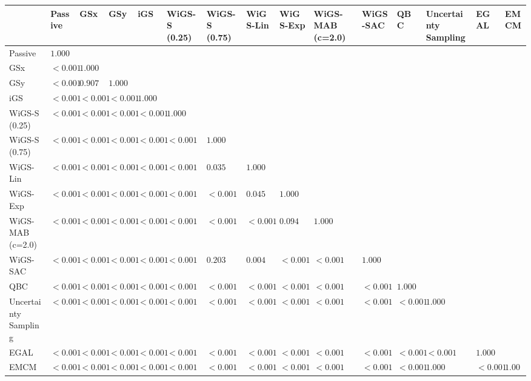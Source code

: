 \begin{tabular}{lllllllllllllll}
\toprule
 & Passive & GSx & GSy & iGS & WiGS-S (0.25) & WiGS-S (0.75) & WiGS-Lin & WiGS-Exp & WiGS-MAB (c=2.0) & WiGS-SAC & QBC & Uncertainty Sampling & EGAL & EMCM \\
\midrule
Passive & $1.000$ &  &  &  &  &  &  &  &  &  &  &  &  &  \\
GSx & $<0.001$ & $1.000$ &  &  &  &  &  &  &  &  &  &  &  &  \\
GSy & $<0.001$ & $0.907$ & $1.000$ &  &  &  &  &  &  &  &  &  &  &  \\
iGS & $<0.001$ & $<0.001$ & $<0.001$ & $1.000$ &  &  &  &  &  &  &  &  &  &  \\
WiGS-S (0.25) & $<0.001$ & $<0.001$ & $<0.001$ & $<0.001$ & $1.000$ &  &  &  &  &  &  &  &  &  \\
WiGS-S (0.75) & $<0.001$ & $<0.001$ & $<0.001$ & $<0.001$ & $<0.001$ & $1.000$ &  &  &  &  &  &  &  &  \\
WiGS-Lin & $<0.001$ & $<0.001$ & $<0.001$ & $<0.001$ & $<0.001$ & $0.035$ & $1.000$ &  &  &  &  &  &  &  \\
WiGS-Exp & $<0.001$ & $<0.001$ & $<0.001$ & $<0.001$ & $<0.001$ & $<0.001$ & $0.045$ & $1.000$ &  &  &  &  &  &  \\
WiGS-MAB (c=2.0) & $<0.001$ & $<0.001$ & $<0.001$ & $<0.001$ & $<0.001$ & $<0.001$ & $<0.001$ & $0.094$ & $1.000$ &  &  &  &  &  \\
WiGS-SAC & $<0.001$ & $<0.001$ & $<0.001$ & $<0.001$ & $<0.001$ & $0.203$ & $0.004$ & $<0.001$ & $<0.001$ & $1.000$ &  &  &  &  \\
QBC & $<0.001$ & $<0.001$ & $<0.001$ & $<0.001$ & $<0.001$ & $<0.001$ & $<0.001$ & $<0.001$ & $<0.001$ & $<0.001$ & $1.000$ &  &  &  \\
Uncertainty Sampling & $<0.001$ & $<0.001$ & $<0.001$ & $<0.001$ & $<0.001$ & $<0.001$ & $<0.001$ & $<0.001$ & $<0.001$ & $<0.001$ & $<0.001$ & $1.000$ &  &  \\
EGAL & $<0.001$ & $<0.001$ & $<0.001$ & $<0.001$ & $<0.001$ & $<0.001$ & $<0.001$ & $<0.001$ & $<0.001$ & $<0.001$ & $<0.001$ & $<0.001$ & $1.000$ &  \\
EMCM & $<0.001$ & $<0.001$ & $<0.001$ & $<0.001$ & $<0.001$ & $<0.001$ & $<0.001$ & $<0.001$ & $<0.001$ & $<0.001$ & $<0.001$ & $1.000$ & $<0.001$ & $1.000$ \\
\bottomrule
\end{tabular}
